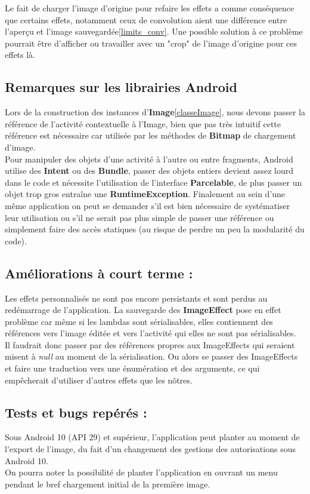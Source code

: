 Le fait de charger l'image d'origine pour refaire les effets a comme conséquence que certains effets, notamment ceux de convolution aient une différence entre l'aperçu et l'image sauvegardée\ref{limits_conv}. Une possible solution à ce problème pourrait être d'afficher ou travailler avec un "crop" de l'image d'origine pour ces effets là.
\\

\subsection{Remarques sur les librairies Android}
Lors de la construction des instances d'\textbf{Image}\ref{classeImage}, nous devons passer la référence de l'activité contextuelle à l'Image, bien que pas très intuitif cette référence est nécessaire car utilisée par les méthodes de \textbf{Bitmap} de chargement d'image.
\\

\label{parcelable}
Pour manipuler des objets d'une activité à l'autre ou entre fragments, Android utilise des \textbf{Intent} ou des \textbf{Bundle}, passer des objets entiers devient assez lourd dans le code et nécessite l'utilisation de l'interface \textbf{Parcelable}, de plus passer un objet trop gros entraîne une \textbf{RuntimeException}. Finalement au sein d'une même application on peut se demander s'il est bien nécessaire de systématiser leur utilisation ou s'il ne serait pas plus simple de passer une référence ou simplement faire des accès statiques (au risque de perdre un peu la modularité du code).

\subsection{Améliorations à court terme :}

Les effets personnalisés ne sont pas encore persistants et sont perdus au redémarrage de l'application. La sauvegarde des \textbf{ImageEffect} pose en effet problème car même si les lambdas sont sérialisables, elles contiennent des références vers l'image éditée et vers l'activité qui elles ne sont pas sérialisables.\\
Il faudrait donc passer par des références propres aux ImageEffects qui seraient misent à \textit{null} au moment de la sérialisation. Ou alors se passer des ImageEffects et faire une traduction vers une énumération et des arguments, ce qui empêcherait d'utiliser d'autres effets que les nôtres.

\subsection{Tests et bugs repérés :}
Sous Android 10 (API 29) et supérieur, l'application peut planter au moment de l'export de l'image, du fait d'un changement des gestions des autorisations sous Android 10.
\\

On pourra noter la possibilité de planter l'application en ouvrant un menu pendant le bref chargement initial de la première image. 
\\

